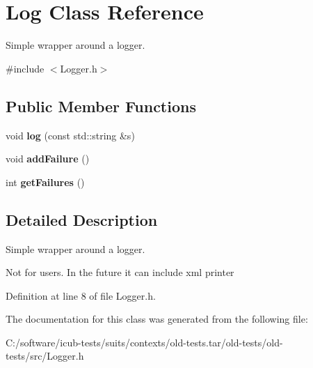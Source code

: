 \section{Log Class Reference}
\label{classLog}


Simple wrapper around a logger.  




{\ttfamily \#include $<$Logger.\+h$>$}

\subsection*{Public Member Functions}
\begin{DoxyCompactItemize}
\item 
void {\bfseries log} (const std\+::string \&s)\label{classLog_a189931e265d5c18d8fc5cab2757299dc}

\item 
void {\bfseries add\+Failure} ()\label{classLog_a3914fbcb54ec6b5def678cea420e95d9}

\item 
int {\bfseries get\+Failures} ()\label{classLog_adae20547e1a79c6da062c46504465845}

\end{DoxyCompactItemize}


\subsection{Detailed Description}
Simple wrapper around a logger. 

Not for users. In the future it can include xml printer 

Definition at line 8 of file Logger.\+h.



The documentation for this class was generated from the following file\+:\begin{DoxyCompactItemize}
\item 
C\+:/software/icub-\/tests/suits/contexts/old-\/tests.\+tar/old-\/tests/old-\/tests/src/Logger.\+h\end{DoxyCompactItemize}
